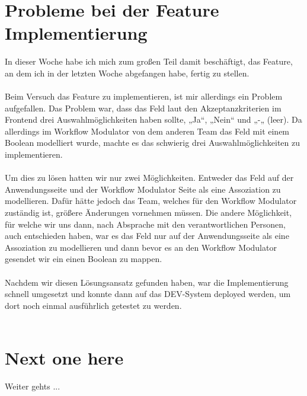 \section{Probleme bei der Feature Implementierung}
In dieser Woche habe ich mich zum großen Teil damit beschäftigt, das Feature, an dem ich in der letzten Woche abgefangen habe, fertig zu stellen. \\\\
Beim Versuch das Feature zu implementieren, ist mir allerdings ein Problem aufgefallen. Das Problem war, dass das Feld laut den Akzeptanzkriterien im Frontend drei Auswahlmöglichkeiten haben sollte, „Ja“, „Nein“ und „-„ (leer). Da allerdings im Workflow Modulator von dem anderen Team das Feld mit einem Boolean modelliert wurde, machte es das schwierig drei Auswahlmöglichkeiten zu implementieren. \\\\
Um dies zu lösen hatten wir nur zwei Möglichkeiten. Entweder das Feld auf der Anwendungsseite und der Workflow Modulator Seite als eine Assoziation zu modellieren. Dafür hätte jedoch das Team, welches für den Workflow Modulator zuständig ist, größere Änderungen vornehmen müssen. Die andere Möglichkeit, für welche wir uns dann, nach Absprache mit den verantwortlichen Personen, auch entschieden haben, war es das Feld nur auf der Anwendungsseite als eine Assoziation zu modellieren und dann bevor es an den Workflow Modulator gesendet wir ein einen Boolean zu mappen. \\\\
Nachdem wir diesen Lösungsansatz gefunden haben, war die Implementierung schnell umgesetzt und konnte dann auf das DEV-System deployed werden, um dort noch einmal ausführlich getestet zu werden. \\\\

\section{Next one here}
Weiter gehts ...